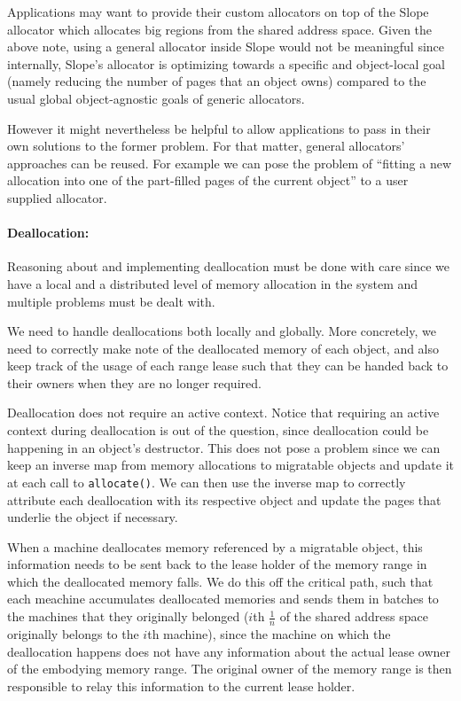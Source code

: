 Applications may want to provide their custom allocators on top of the Slope
allocator which allocates big regions from the shared address space. Given the
above note, using a general
allocator inside Slope would not be meaningful since internally, Slope's
allocator is optimizing towards a specific and object-local goal (namely
reducing the number of pages that an object owns) compared to the usual
global object-agnostic goals of generic allocators.

However it might
nevertheless be helpful to allow applications to pass in their own solutions
to the former problem. For that matter, general allocators' approaches can
be reused. For example we can pose the problem of ``fitting a new allocation
into one of the part-filled pages of the current object'' to a user supplied
allocator.

\paragraph{Deallocation:} Reasoning about and implementing deallocation must
be done with care since we have a local and a distributed level of memory
allocation in the system and multiple problems must be dealt with.

We need to handle deallocations both locally and globally. More concretely, we
need to correctly make note of the deallocated memory of each object, and also
keep track of the usage of each range lease such that they can be handed back
to their owners when they are no longer required.

Deallocation does not require an active context. Notice that requiring
an active context during deallocation is out of the question, since
deallocation could be happening in an object's destructor. This does not pose
a problem since we can keep an inverse map from memory allocations to
migratable objects and update it at each call to \texttt{allocate()}. We can
then use the inverse map to correctly attribute each deallocation with its
respective object and update the pages that underlie the object if necessary.

When a machine deallocates memory referenced by a migratable object, this
information needs to be sent back to the lease holder of the memory range in
which the deallocated memory falls. We do this off the critical path, such that
each meachine accumulates deallocated memories and sends them in batches to
the machines that they originally belonged ($i$th $\frac{1}{n}$ of the
shared address space originally belongs to the $i$th machine), since the machine
on which the
deallocation happens does not have any information about
the actual lease owner of the embodying memory range. The original owner
of the memory range is then responsible to relay this information to the current
lease holder.

